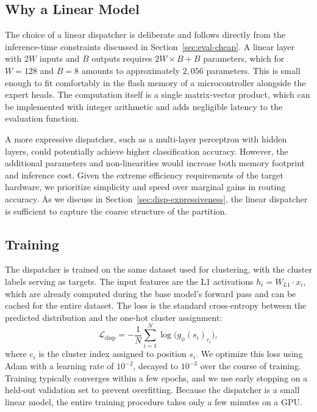 \subsection{Why a Linear Model}\label{sec:disp-linear}

The choice of a linear dispatcher is deliberate and follows directly from the inference-time constraints discussed in Section~\ref{sec:eval-cheap}. A linear layer with \(2W\) inputs and \(B\) outputs requires \(2W \times B + B\) parameters, which for \(W=128\) and \(B=8\) amounts to approximately \(2{,}056\) parameters. This is small enough to fit comfortably in the flash memory of a microcontroller alongside the expert heads. The computation itself is a single matrix-vector product, which can be implemented with integer arithmetic and adds negligible latency to the evaluation function.

A more expressive dispatcher, such as a multi-layer perceptron with hidden layers, could potentially achieve higher classification accuracy. However, the additional parameters and non-linearities would increase both memory footprint and inference cost. Given the extreme efficiency requirements of the target hardware, we prioritize simplicity and speed over marginal gains in routing accuracy. As we discuss in Section~\ref{sec:disp-expressiveness}, the linear dispatcher is sufficient to capture the coarse structure of the partition.

\subsection{Training}\label{sec:disp-train}

The dispatcher is trained on the same dataset used for clustering, with the cluster labels serving as targets. The input features are the L1 activations \(h_i = W_{L1} \cdot x_i\), which are already computed during the base model's forward pass and can be cached for the entire dataset. The loss is the standard cross-entropy between the predicted distribution and the one-hot cluster assignment:
\[
\mathcal{L}_{\mathrm{disp}} = -\frac{1}{N} \sum_{i=1}^N \log \bigl(g_\phi(s_i)_{c_i}\bigr),
\]
where \(c_i\) is the cluster index assigned to position \(s_i\). We optimize this loss using Adam with a learning rate of \(10^{-2}\), decayed to \(10^{-3}\) over the course of training. Training typically converges within a few epochs, and we use early stopping on a held-out validation set to prevent overfitting. Because the dispatcher is a small linear model, the entire training procedure takes only a few minutes on a GPU.


